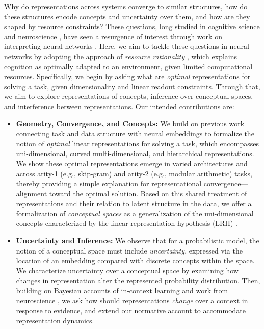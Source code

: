 \documentclass[11pt]{article}
\begin{document}
Why do representations across systems converge to similar structures, how do these structures encode concepts and uncertainty over them, and how are they shaped by resource constraints? These questions, long studied in cognitive science and neuroscience \citep{olshausen1996emergence, beck2008probabilistic, gardenfors2004conceptual, laakso2000content, edelman1998representation},  have seen a resurgence of interest through work on interpreting neural networks \citep{elhage2022toy, huh2024platonic, park2025geometry, park2023linear, shai2024transformers}. Here, we aim to tackle these questions in neural networks by adopting the approach of \textit{resource rationality} \citep{icard2023resource, lieder2020resource}, which explains cognition as optimally adapted to an environment, given limited computational resources. Specifically, we begin by asking what are \textit{optimal} representations for solving a task, given dimensionality and linear readout constraints. Through that, we aim to explore representations of concepts, inference over conceptual spaces, and interference between representations. Our intended contributions are: \begin{itemize}
    \item \textbf{Geometry, Convergence, and Concepts:} We build on previous work connecting task and data structure with neural embeddings \citep{levy2014neural, karkada2026symmetry, Korchinski2025LinearAnalogies, karkada2026symmetry, arora2016latent, saxe2019mathematical, nanda2023progress, fu2026convergentevolutiondifferentlanguage, marchetti2024harmonics} to formalize the notion of \textit{optimal} linear representations for solving a task, which encompasses uni-dimensional, curved multi-dimensional, and hierarchical representations. We show these optimal representations emerge in varied architectures and across arity-1 (e.g., skip-gram) and arity-2 (e.g., modular arithmetic) tasks, thereby providing a simple explanation for representational convergence---alignment toward the optimal solution. Based on this shared treatment of representations and their relation to latent structure in the data, we offer a formalization of \textit{conceptual spaces} as a generalization of the uni-dimensional concepts characterized by the linear representation hypothesis (LRH) \citep{park2023linear, elhage2022toy}. 
    
    \item \textbf{Uncertainty and Inference:} We observe that for a probabilistic model, the notion of a conceptual space must include \textit{uncertainty}, expressed via the location of an embedding compared with discrete concepts within the space. We characterize uncertainty over a conceptual space by examining how changes in representation alter the represented probability distribution. Then, building on Bayesian accounts of in-context learning \citep{bigelow2026beliefdynamicsrevealdual, wurgaft2025incontextlearningstrategiesemerge, zhang2023doesincontextlearninglearn, xie2022explanationincontextlearningimplicit} and work from neuroscience \citep{sorscher2022neuralgeometry}, we ask how should representations \textit{change} over a context in response to evidence, and extend our normative account to accommodate representation dynamics. 
    

\end{itemize}
\end{document}
